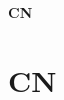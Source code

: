 \ifsolo
    ~

    \vspace{1cm}

    \begin{center}
        \textbf{\LARGE CN} \\[1em]
    \end{center}
    \tableofcontents
\else
    \chapter{CN}

    \minitoc
\fi
\thispagestyle{empty}

